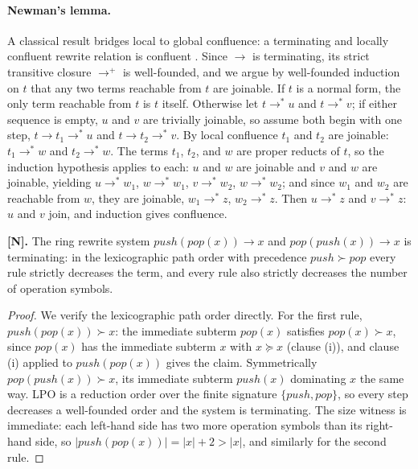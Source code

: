\paragraph{Newman's lemma.}
A classical result bridges local to global confluence: a terminating and
locally confluent rewrite relation is confluent \cite{newman}. Since $\to$
is terminating, its strict transitive closure $\to^{+}$ is well-founded, and
we argue by well-founded induction on $t$ that any two terms reachable from
$t$ are joinable. If $t$ is a normal form, the only term reachable from $t$
is $t$ itself. Otherwise let $t \to^{*} u$ and $t \to^{*} v$; if either
sequence is empty, $u$ and $v$ are trivially joinable, so assume both begin
with one step, $t \to t_1 \to^{*} u$ and $t \to t_2 \to^{*} v$. By local
confluence $t_1$ and $t_2$ are joinable: $t_1 \to^{*} w$ and
$t_2 \to^{*} w$. The terms $t_1$, $t_2$, and $w$ are proper reducts of $t$,
so the induction hypothesis applies to each: $u$ and $w$ are joinable and
$v$ and $w$ are joinable, yielding $u \to^{*} w_1$, $w \to^{*} w_1$,
$v \to^{*} w_2$, $w \to^{*} w_2$; and since $w_1$ and $w_2$ are reachable
from $w$, they are joinable, $w_1 \to^{*} z$, $w_2 \to^{*} z$. Then
$u \to^{*} z$ and $v \to^{*} z$: $u$ and $v$ join, and induction gives
confluence.

\begin{theorem}\label{thm:13}
\textbf{[N].} The ring rewrite system $\mathit{push} (\mathit{pop} (x)) \to x$
and $\mathit{pop} (\mathit{push} (x)) \to x$ is terminating: in the
lexicographic path order with precedence
$\mathit{push} \succ \mathit{pop}$ every rule strictly decreases the term,
and every rule also strictly decreases the number of operation symbols.
\end{theorem}

\begin{proof}
We verify the lexicographic path order directly. For the first rule,
$\mathit{push} (\mathit{pop} (x)) \succ x$: the immediate subterm
$\mathit{pop} (x)$ satisfies $\mathit{pop} (x) \succ x$, since
$\mathit{pop} (x)$ has the immediate subterm $x$ with $x \succeq x$ (clause
(i)), and clause (i) applied to $\mathit{push} (\mathit{pop} (x))$ gives the
claim. Symmetrically $\mathit{pop} (\mathit{push} (x)) \succ x$, its
immediate subterm $\mathit{push} (x)$ dominating $x$ the same way. LPO is a
reduction order over the finite signature $\{\mathit{push}, \mathit{pop}\}$,
so every step decreases a well-founded order and the system is terminating.
The size witness is immediate: each left-hand side has two more operation
symbols than its right-hand side, so $|\mathit{push} (\mathit{pop} (x))| =
|x| + 2 > |x|$, and similarly for the second rule.
\end{proof}

